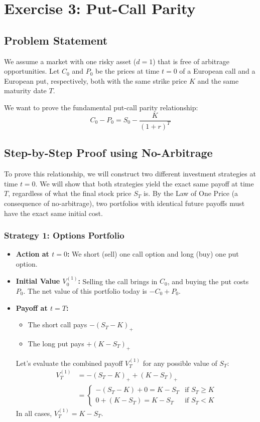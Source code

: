\section{Exercise 3: Put-Call Parity}

\subsection{Problem Statement}
We assume a market with one risky asset ($d=1$) that is free of arbitrage opportunities. Let $C_0$ and $P_0$ be the prices at time $t=0$ of a European call and a European put, respectively, both with the same strike price $K$ and the same maturity date $T$. 

We want to prove the fundamental put-call parity relationship:
\begin{equation}
    C_0 - P_0 = S_0 - \frac{K}{(1+r)^T}
\end{equation}

\subsection{Step-by-Step Proof using No-Arbitrage}
To prove this relationship, we will construct two different investment strategies at time $t=0$. We will show that both strategies yield the exact same payoff at time $T$, regardless of what the final stock price $S_T$ is. By the Law of One Price (a consequence of no-arbitrage), two portfolios with identical future payoffs must have the exact same initial cost.

\subsubsection*{Strategy 1: Options Portfolio}
\begin{itemize}
    \item \textbf{Action at $t=0$:} We short (sell) one call option and long (buy) one put option.
    \item \textbf{Initial Value $V_0^{(1)}$:} Selling the call brings in $C_0$, and buying the put costs $P_0$. The net value of this portfolio today is $-C_0 + P_0$.
    \item \textbf{Payoff at $t=T$:} 
    \begin{itemize}
        \item The short call pays $-(S_T - K)_+$
        \item The long put pays $+(K - S_T)_+$
    \end{itemize}
    Let's evaluate the combined payoff $V_T^{(1)}$ for any possible value of $S_T$:
    \begin{align}
        V_T^{(1)} &= -(S_T - K)_+ + (K - S_T)_+ \\
        &= \begin{cases} 
            -(S_T - K) + 0 = K - S_T & \text{if } S_T \ge K \\
            0 + (K - S_T) = K - S_T & \text{if } S_T < K 
           \end{cases}
    \end{align}
    In all cases, $V_T^{(1)} = K - S_T$.
\end{itemize}

